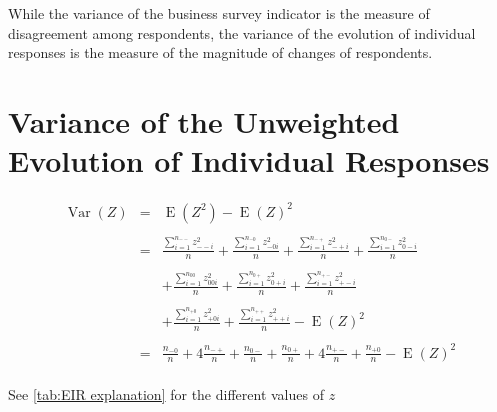 \documentclass[12pt,a4paper,oneside]{book}
\DeclareMathOperator{\Var}{Var}
\DeclareMathOperator{\E}{E}
\begin{document}
While the variance of the business survey indicator is the measure of disagreement among respondents, the variance of the evolution of individual responses is the measure of the magnitude of changes of respondents.


\section{Variance of the Unweighted Evolution of Individual Responses}






\begin{eqnarray}
\Var(Z) &=&  
	\E \left( Z^2\right) - \E \left( Z\right)^2 \nonumber \\ \nonumber \\
	&=&  \frac{ \sum_{i=1}^{n_{--}} z^2_{--i}}{n} 
     +  \frac{\sum_{i=1}^{n_{-0}} z^2_{-0i} }{n} 
    +  \frac{\sum_{i=1}^{n_{-+}} z^2_{-+i}}{n} 
    +  \frac{\sum_{i=1}^{n_{0-}} z^2_{0-i} }{n} \nonumber  \\ \nonumber  \\
    && +  \frac{\sum_{i=1}^{n_{00}} z^2_{00i} }{n}  
      +  \frac{\sum_{i=1}^{n_{0+}} z^2_{0+i}}{n} 
    +  \frac{\sum_{i=1}^{n_{+-}} z^2_{+-i} }{n}  \nonumber \\ \nonumber  \\
    && +  \frac{\sum_{i=1}^{n_{+0}} z^2_{+0i} }{n} 
    +  \frac{\sum_{i=1}^{n_{++}} z^2_{++i}}{n}   
     - \E(Z)^2 \\  \nonumber  \\ 
     &=& \frac{n_{-0}}{n} 
    + 4  \frac{n_{-+}}{n} 
    +  \frac{n_{0-}}{n}  
    +        \frac{n_{0+}}{n} 
    + 4  \frac{n_{+-}}{n}   
    +  \frac{n_{+0}}{n}  
     - \E(Z)^2 \nonumber \\
\end{eqnarray}

See \autoref{tab:EIR explanation} for the different values of $z$
\end{document}
